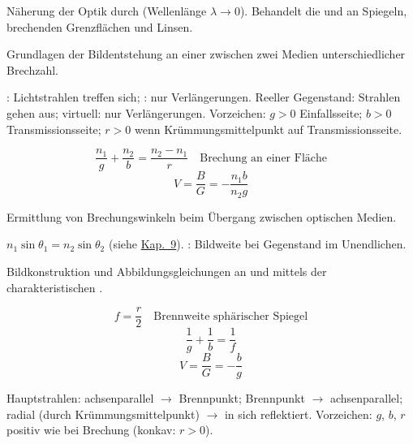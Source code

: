 

\begin{runintext}
Näherung der Optik durch  (Wellenlänge $\lambda \to 0$). Behandelt die  und  an Spiegeln, brechenden Grenzflächen und Linsen.
\end{runintext}

\begin{runintext}
Grundlagen der Bildentstehung an einer  zwischen zwei Medien unterschiedlicher Brechzahl.
\end{runintext}
\begin{runintext}
: Lichtstrahlen treffen sich; : nur Verlängerungen. Reeller Gegenstand: Strahlen gehen aus; virtuell: nur Verlängerungen.
Vorzeichen: $g>0$ Einfallsseite; $b>0$ Transmissionsseite; $r>0$ wenn Krümmungsmittelpunkt auf Transmissionsseite.
\end{runintext}
\begin{formulabox}
\[ \frac{n_1}{g} + \frac{n_2}{b} = \frac{n_2-n_1}{r} \quad \text{Brechung an einer Fläche} \]
\formulasep
\[ V = \frac{B}{G} = -\frac{n_1 b}{n_2 g} \]
\end{formulabox}

\begin{runintext}
Ermittlung von Brechungswinkeln beim Übergang zwischen optischen Medien.
\end{runintext}
\begin{runintext}
$n_1\sin\theta_1 = n_2\sin\theta_2$ (siehe \hyperref[sec:9-0]{Kap.~9}). : Bildweite bei Gegenstand im Unendlichen.
\end{runintext}

\begin{runintext}
Bildkonstruktion und Abbildungsgleichungen an  und  mittels der charakteristischen .
\end{runintext}
\begin{formulabox}
\[ f = \frac{r}{2} \quad \text{Brennweite sphärischer Spiegel} \]
\formulasep
\[ \frac{1}{g} + \frac{1}{b} = \frac{1}{f} \]
\[ V = \frac{B}{G} = -\frac{b}{g} \]
\end{formulabox}
\begin{runintext}
Hauptstrahlen: achsenparallel $\to$ Brennpunkt; Brennpunkt $\to$ achsenparallel; radial (durch Krümmungsmittelpunkt) $\to$ in sich reflektiert. Vorzeichen: $g$, $b$, $r$ positiv wie bei Brechung (konkav: $r>0$).
\end{runintext}

